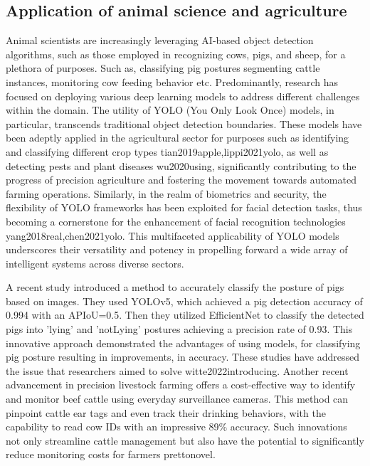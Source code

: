 \subsection*{Application of animal science and agriculture}
Animal scientists are increasingly leveraging AI-based object detection algorithms, such as those employed in recognizing cows, pigs, and sheep, for a plethora of purposes. Such as, classifying pig postures segmenting cattle instances, monitoring cow feeding behavior etc. Predominantly, research has focused on deploying various deep learning models to address different challenges within the domain. The utility of YOLO (You Only Look Once) models, in particular, transcends traditional object detection boundaries. These models have been adeptly applied in the agricultural sector for purposes such as identifying and classifying different crop types {tian2019apple,lippi2021yolo}, as well as detecting pests and plant diseases {wu2020using}, significantly contributing to the progress of precision agriculture and fostering the movement towards automated farming operations. Similarly, in the realm of biometrics and security, the flexibility of YOLO frameworks has been exploited for facial detection tasks, thus becoming a cornerstone for the enhancement of facial recognition technologies {yang2018real,chen2021yolo}. This multifaceted applicability of YOLO models underscores their versatility and potency in propelling forward a wide array of intelligent systems across diverse sectors.

A recent study introduced a method to accurately classify the posture of pigs based on images. They used YOLOv5, which achieved a pig detection accuracy of 0.994 with an APIoU=0.5. Then they utilized EfficientNet to classify the detected pigs into 'lying' and 'notLying' postures achieving a precision rate of 0.93. This innovative approach demonstrated the advantages of using models, for classifying pig posture resulting in improvements, in accuracy. These studies have addressed the issue that researchers aimed to solve {witte2022introducing}. Another recent advancement in precision livestock farming offers a cost-effective way to identify and monitor beef cattle using everyday surveillance cameras. This method can pinpoint cattle ear tags and even track their drinking behaviors, with the capability to read cow IDs with an impressive 89\% accuracy. Such innovations not only streamline cattle management but also have the potential to significantly reduce monitoring costs for farmers {prettonovel}.


